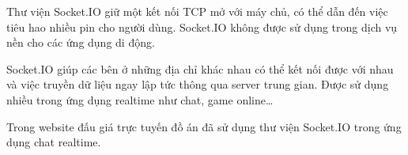 \documentclass[../DoAn.tex]{subfiles}
\begin{document}
Thư viện Socket.IO giữ một kết nối TCP mở với máy chủ, có thể dẫn đến việc tiêu hao nhiều pin cho người dùng. Socket.IO không được sử dụng trong dịch vụ nền cho các ứng dụng di động. 

Socket.IO giúp các bên ở những địa chỉ khác nhau có thể kết nối được với nhau và việc truyền dữ liệu ngay lập tức thông qua server trung gian. Được sử dụng nhiều trong ứng dụng realtime như chat, game online…

Trong website đấu giá trực tuyến đồ án đã sử dụng thư viện Socket.IO trong ứng dụng chat realtime.
\end{document}
